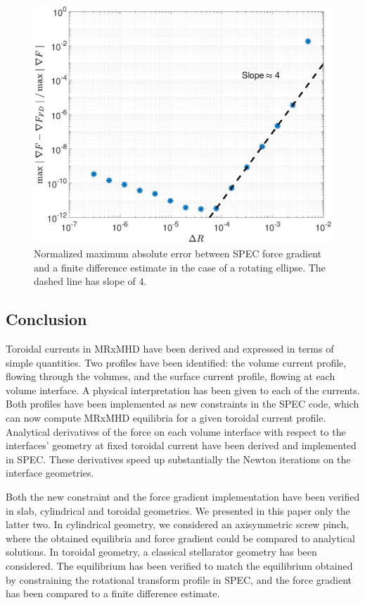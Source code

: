 \documentclass[my_thesis.tex]{subfiles}
\begin{document}
\begin{figure}
	\centering
	\includegraphics[width=.5\linewidth]{main/Figures_CurrentConstraint/ABaillod_fig10.pdf}
	\caption{Normalized maximum absolute error between \ac{SPEC} force gradient and a finite difference estimate in the case of a rotating ellipse. The dashed line has slope of $4$.} \label{fig:conv_FG_rotell}
\end{figure}




\subsection{Conclusion}

Toroidal currents in \ac{MRxMHD} have been derived and expressed in terms of simple quantities. Two profiles have been identified: the volume current profile, flowing through the volumes, and the surface current profile, flowing at each volume interface. A physical interpretation has been given to each of the currents. Both profiles have been implemented as new constraints in the \ac{SPEC} code, which can now compute \ac{MRxMHD} equilibria for a given toroidal current profile. Analytical derivatives of the force on each volume interface with respect to the interfaces' geometry at fixed toroidal current have been derived and implemented in \ac{SPEC}. These derivatives speed up substantially the Newton iterations on the interface geometries.

Both the new constraint and the force gradient implementation have been verified in slab, cylindrical and toroidal geometries. We presented in this paper only the latter two. In cylindrical geometry, we considered an axisymmetric screw pinch, where the obtained equilibria and force gradient could be compared to analytical solutions. In toroidal geometry, a classical stellarator geometry has been considered. The equilibrium has been verified to match the equilibrium obtained by constraining the rotational transform profile in \ac{SPEC}, and the force gradient has been compared to a finite difference estimate. 
\end{document}
